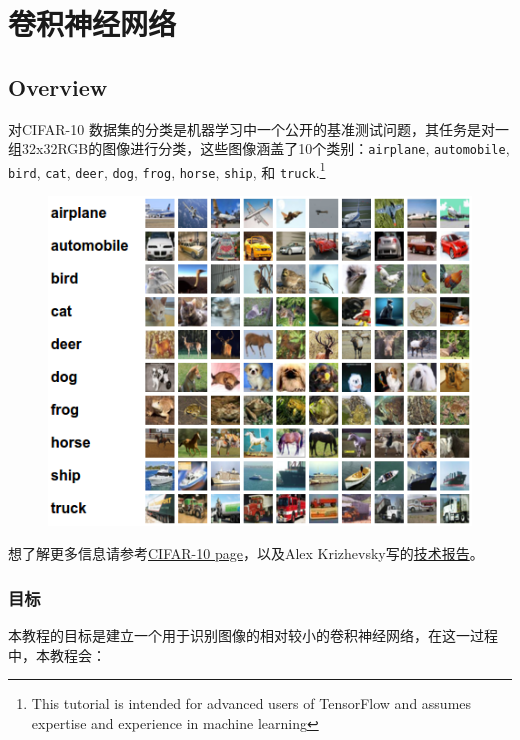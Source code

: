 



\newpage
\section {卷积神经网络} \label{cnn}

\subsection {Overview}


对CIFAR-10 数据集的分类是机器学习中一个公开的基准测试问题，其任务是对一组32x32RGB的图像进行分类，这些图像涵盖了10个类别：\lstinline{airplane}, \lstinline{automobile}, \lstinline{bird}, \lstinline{cat}, \lstinline{deer}, \lstinline{dog}, \lstinline{frog}, \lstinline{horse}, \lstinline{ship}, 和 \lstinline{truck}.\footnote{This tutorial is intended for advanced users of TensorFlow and assumes expertise and experience in machine learning}

\begin{figure}[htbp]
\centering
\includegraphics[width=.65\textwidth]{../SOURCE/images/cifar_samples.png}
\caption{}
\end{figure}

想了解更多信息请参考\href{http://www.cs.toronto.edu/~kriz/cifar.html}{CIFAR-10 page}，以及Alex Krizhevsky写的\href{http://www.cs.toronto.edu/~kriz/learning-features-2009-TR.pdf}{技术报告}。

\subsubsection {目标}
本教程的目标是建立一个用于识别图像的相对较小的卷积神经网络，在这一过程中，本教程会：

